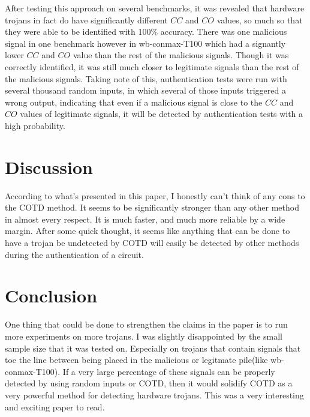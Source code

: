 \documentclass[12pt]{article}
\begin{document}
After testing this approach on several benchmarks, it was revealed that hardware trojans in fact do have significantly different $CC$ and $CO$ values, so much so that they were able to be identified with 100\% accuracy. There was one malicious signal in one benchmark however in wb-conmax-T100 which had a signantly lower $CC$ and $CO$ value than the rest of the malicious signals. Though it was correctly identified, it was still much closer to legitimate signals than the rest of the malicious signals. Taking note of this, authentication tests were run with several thousand random inputs, in which several of those inputs triggered a wrong output, indicating that even if a malicious signal is close to the $CC$ and $CO$ values of legitimate signals, it will be detected by authentication tests with a high probability.

\section{Discussion}

According to what's presented in this paper, I honestly can't think of any cons to the COTD method. It seems to be significantly stronger than any other method in almost every respect. It is much faster, and much more reliable by a wide margin. After some quick thought, it seems like anything that can be done to have a trojan be undetected by COTD will easily be detected by other methods during the authentication of a circuit.

\section{Conclusion}

One thing that could be done to strengthen the claims in the paper is to run more experiments on more trojans. I was slightly disappointed by the small sample size that it was tested on. Especially on trojans that contain signals that toe the line between being placed in the malicious or legitmate pile(like wb-conmax-T100). If a very large percentage of these signals can be properly detected by using random inputs or COTD, then it would solidify COTD as a very powerful method for detecting hardware trojans. This was a very interesting and exciting paper to read.
\end{document}

